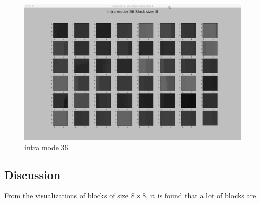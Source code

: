 \begin{figure}[H]
\begin{minipage}{0.49\textwidth}
        \includegraphics[width=\linewidth]{Figures/visu-size8x8/8-36}
        \caption[Intra mode 36]{intra mode 36.}
        \label{fig:size8_mode36}
    \end{minipage}
\end{figure}

\subsection{Discussion}\label{subsec:discussion-about-data-visu}
From the visualizations of blocks of size $8\times8$,
it is found that a lot of blocks are 
